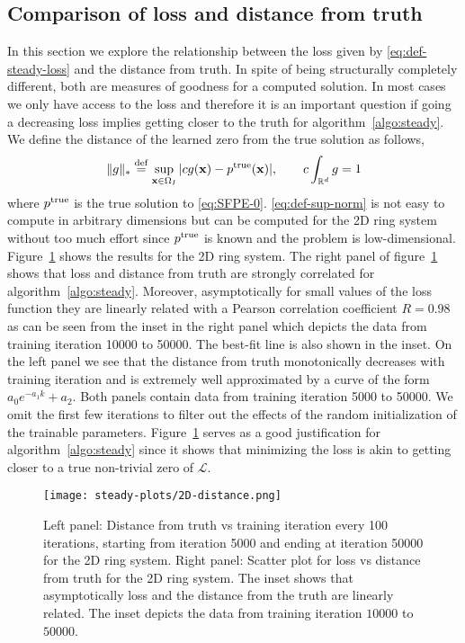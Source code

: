 \subsection{Comparison of loss and distance from truth} In this section we explore the relationship between the loss given by \eqref{eq:def-steady-loss} and the distance from truth. In spite of being structurally completely different, both are measures of goodness for a computed solution. In most cases we only have access to the loss and therefore it is an important question if going a decreasing loss implies getting closer to the truth for algorithm~\ref{algo:steady}. We define the distance of the learned zero from the true solution as follows,
\begin{align}
    \|g\|_*\stackrel{\rm def}{=}\sup_{\mathbf x\in\Omega_I} |cg(\mathbf x) - p^{\rm true}(\mathbf x)|\label{eq:def-sup-norm}, \qquad c\int_{\mathbb R^d}g=1
\end{align}
where $p^{\rm true}$ is the true solution to \eqref{eq:SFPE-0}. \eqref{eq:def-sup-norm} is not easy to compute in arbitrary dimensions but can be computed for the 2D ring system without too much effort since $p^{\rm true}$ is known and the problem is low-dimensional. Figure~\ref{fig:dist-loss} shows the results for the 2D ring system. The right panel of figure~\ref{fig:dist-loss} shows that loss and distance from truth are strongly correlated for algorithm~\ref{algo:steady}. Moreover, asymptotically for small values of the loss function they are linearly related with a Pearson correlation coefficient $R=0.98$ as can be seen from the inset in the right panel which depicts the data from training iteration 10000 to 50000. The best-fit line is also shown in the inset. On the left panel we see that the distance from truth monotonically decreases with training iteration and is extremely well approximated by a curve of the form $a_0e^{-a_1k}+a_2$. Both panels contain data from training iteration 5000 to 50000. We omit the first few iterations to filter out the effects of the random initialization of the trainable parameters. Figure~\ref{fig:dist-loss} serves as a good justification for algorithm~\ref{algo:steady} since it shows that minimizing the loss is akin to getting closer to a true non-trivial zero of $\mathcal L$.
 
\begin{figure}[!ht]
    \centering\texttt{[image: steady-plots/2D-distance.png]}
    \caption{Left panel: Distance from truth vs training iteration every 100 iterations, starting from iteration 5000 and ending at iteration 50000 for the 2D ring system. Right panel: Scatter plot for loss vs distance from truth for the 2D ring system. The inset shows that asymptotically loss and the distance from the truth are linearly related. The inset depicts the data from training iteration $10000$ to $50000$.}
    \label{fig:dist-loss}
\end{figure}